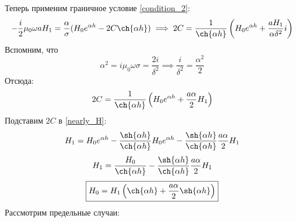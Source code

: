 \documentclass[15pt,a5paper,reqno]{article}
\begin{document}
    Теперь применим граничное условие \eqref{condition_2}:
    \begin{equation*}
        -\frac{i}{2}\mu_0\omega aH_1 = \frac{\alpha}{\sigma}(H_0 e^{\alpha h} - 2C\ch{\alpha h}) \implies 2C = \frac{1}{\ch{\alpha h}}\left(H_0 e^{\alpha h} + \frac{aH_1}{\alpha\delta^2}i\right)
    \end{equation*}
    Вспомним, что
    \begin{equation*}
        \alpha^2 = i\mu_0\omega\sigma = \frac{2i}{\delta^2} \implies \frac{i}{\delta^2} = \frac{\alpha^2}{2}
    \end{equation*}
    Отсюда:
    \begin{equation*}
        2C = \frac{1}{\ch{\alpha h}}\left(H_0 e^{\alpha h} + \frac{a\alpha}{2}H_1\right)
    \end{equation*}
    Подставим $2C$ в \eqref{nearly_H}:
    \begin{equation*}
        H_1 = H_0e^{\alpha h} - \frac{\sh{\alpha h}}{\ch{\alpha h}}H_0 e^{\alpha h} - \frac{\sh{\alpha h}}{\ch{\alpha h}}\frac{a\alpha}{2}H_1
    \end{equation*}
    \begin{equation*}
        H_1 = \frac{H_0}{\ch{\alpha h}} - \frac{\sh{\alpha h}}{\ch{\alpha h}}\frac{a\alpha}{2}H_1
    \end{equation*}
    \begin{equation*}
        \boxed{H_0 = H_1\left(\ch{\alpha h} + \frac{a\alpha}{2}\sh{\alpha h}\right)}
    \end{equation*}
    Рассмотрим предельные случаи:
\end{document}
